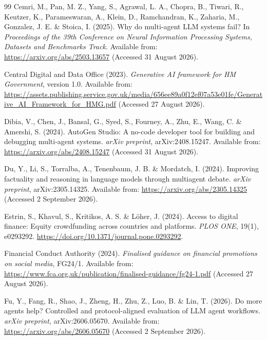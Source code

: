 \begin{thebibliography}{99}
Cemri, M., Pan, M. Z., Yang, S., Agrawal, L. A., Chopra, B., Tiwari, R., Keutzer, K.,
Parameswaran, A., Klein, D., Ramchandran, K., Zaharia, M., Gonzalez, J. E. \& Stoica, I. (2025).
Why do multi-agent LLM systems fail?
In \emph{Proceedings of the 39th Conference on Neural Information Processing Systems, Datasets and
Benchmarks Track}. Available from: \url{https://arxiv.org/abs/2503.13657}
(Accessed 31 August 2026).

Central Digital and Data Office (2023).
\emph{Generative AI framework for HM Government}, version 1.0.
Available from:
\url{https://assets.publishing.service.gov.uk/media/656ee89a0f12ef07a53e01fe/Generative_AI_Framework_for_HMG.pdf}
(Accessed 27 August 2026).

Dibia, V., Chen, J., Bansal, G., Syed, S., Fourney, A., Zhu, E., Wang, C. \& Amershi, S. (2024).
AutoGen Studio: A no-code developer tool for building and debugging multi-agent systems.
\emph{arXiv preprint}, arXiv:2408.15247.
Available from: \url{https://arxiv.org/abs/2408.15247} (Accessed 31 August 2026).

Du, Y., Li, S., Torralba, A., Tenenbaum, J. B. \& Mordatch, I. (2024).
Improving factuality and reasoning in language models through multiagent debate.
\emph{arXiv preprint}, arXiv:2305.14325.
Available from: \url{https://arxiv.org/abs/2305.14325} (Accessed 2 September 2026).

Estrin, S., Khavul, S., Kritikos, A. S. \& L\"oher, J. (2024).
Access to digital finance: Equity crowdfunding across countries and platforms.
\emph{PLOS ONE}, 19(1), e0293292.
\url{https://doi.org/10.1371/journal.pone.0293292}.

Financial Conduct Authority (2024).
\emph{Finalised guidance on financial promotions on social media}, FG24/1.
Available from: \url{https://www.fca.org.uk/publication/finalised-guidance/fg24-1.pdf}
(Accessed 27 August 2026).

Fu, Y., Fang, R., Shao, J., Zheng, H., Zhu, Z., Luo, B. \& Lin, T. (2026).
Do more agents help? Controlled and protocol-aligned evaluation of LLM agent workflows.
\emph{arXiv preprint}, arXiv:2606.05670.
Available from: \url{https://arxiv.org/abs/2606.05670} (Accessed 2 September 2026).


\end{thebibliography}
